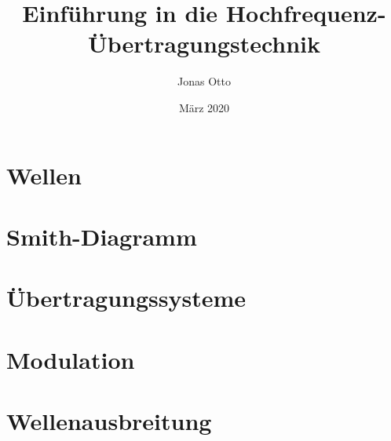 \documentclass{report}
\title{Einführung in die Hochfrequenz-Übertragungstechnik}
\author{Jonas Otto}
\date{März 2020}
\begin{document}
\tableofcontents
\maketitle

\chapter{Wellen}

\chapter{Smith-Diagramm}



\chapter{Übertragungssysteme}
\chapter{Modulation}
\chapter{Wellenausbreitung}
\end{document}
